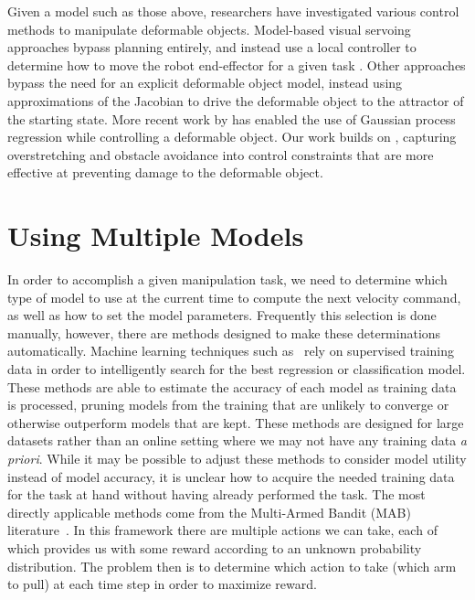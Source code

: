 Given a model such as those above, researchers have investigated various control methods to manipulate deformable objects. Model-based visual servoing approaches bypass planning entirely, and instead use a local controller to determine how to move the robot end-effector for a given task \cite{Hirai2000, Wada2001, Smolen2009}. Other approaches \cite{Berenson2013, Navarro-Alarcon2014, NavarroAlarcon2016, NavarroAlarcon2018} bypass the need for an explicit deformable object model, instead using approximations of the Jacobian to drive the deformable object to the attractor of the starting state. More recent work by \citet{Hu2018deformable_gpr} has enabled the use of Gaussian process regression while controlling a deformable object. Our work builds on \citet{Berenson2013}, capturing overstretching and obstacle avoidance into control constraints that are more effective at preventing damage to the deformable object.



\section{Using Multiple Models}

In order to accomplish a given manipulation task, we need to determine which type of model to use at the current time to compute the next velocity command, as well as how to set the model parameters. Frequently this selection is done manually, however, there are methods designed to make these determinations automatically. Machine learning techniques such as~\cite{Maron1994, Sparks2015} rely on supervised training data in order to intelligently search for the best regression or classification model. These methods are able to estimate the accuracy of each model as training data is processed, pruning models from the training that are unlikely to converge or otherwise outperform models that are kept. These methods are designed for large datasets rather than an online setting where we may not have any training data \textit{a priori}. While it may be possible to adjust these methods to consider model utility instead of model accuracy, it is unclear how to acquire the needed training data for the task at hand without having already performed the task. The most directly applicable methods come from the Multi-Armed Bandit (MAB) literature~\cite{Whittle1988, Auer2002, Gittins2011}. In this framework there are multiple actions we can take, each of which provides us with some reward according to an unknown probability distribution. The problem then is to determine which action to take (which arm to pull) at each time step in order to maximize reward.


